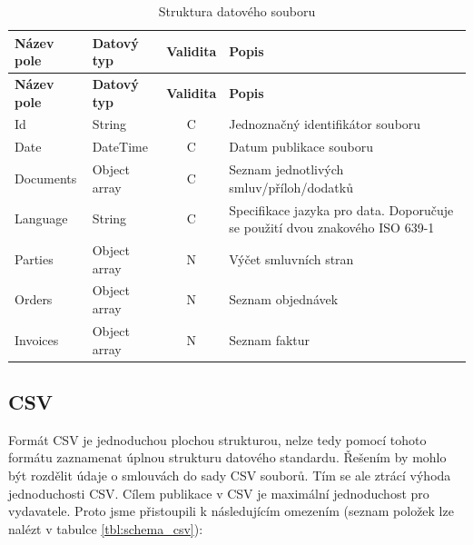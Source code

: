 \begin{center}
\begin{longtable}{lp{20mm}cp{65mm}}
\label{tbl:strukturaJson} \\
\multicolumn{1}{l}{\textbf{Název pole}} & 
\multicolumn{1}{l}{\textbf{Datový typ}} & 
\multicolumn{1}{l}{\textbf{Validita}} & 
\multicolumn{1}{l}{\textbf{Popis}} \\ \hline 
\endfirsthead
\multicolumn{1}{l}{\textbf{Název pole}} & 
\multicolumn{1}{l}{\textbf{Datový typ}} & 
\multicolumn{1}{l}{\textbf{Validita}} & 
\multicolumn{1}{l}{\textbf{Popis}} \\ \hline 
\hline
\endhead
\endfoot
\caption{Struktura datového souboru}
\endlastfoot
\rowcolor{validateC}Id & String & C & Jednoznačný identifikátor souboru \\
\rowcolor{validateC}Date & DateTime & C & Datum publikace souboru \\
\rowcolor{validateC}Documents & Object array & C & Seznam jednotlivých smluv/příloh/dodatků \\
\rowcolor{validateC}Language & String & C & Specifikace jazyka pro data. Doporučuje se použití dvou znakového ISO 639-1 \\
Parties & Object array & N & Výčet smluvních stran \\
Orders & Object array & N & Seznam objednávek \\
Invoices & Object array & N & Seznam faktur \\
\end{longtable}
\end{center}



\newpage

\subsection{CSV}

Formát CSV je jednoduchou plochou strukturou, nelze tedy pomocí tohoto formátu zaznamenat úplnou strukturu datového standardu. Řešením by mohlo být rozdělit údaje o smlouvách do sady CSV souborů. Tím se ale ztrácí výhoda jednoduchosti CSV. Cílem publikace v CSV je maximální jednoduchost pro vydavatele. Proto jsme přistoupili k následujícím omezením (seznam položek lze nalézt v tabulce \ref{tbl:schema_csv}):

